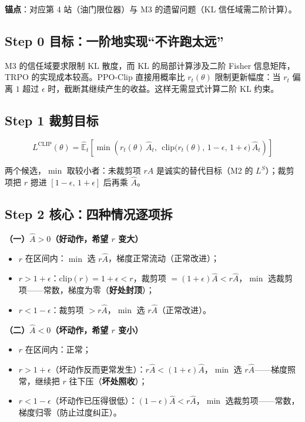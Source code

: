 \documentclass[UTF8,12pt,a4paper]{ctexrep}
\begin{document}
\textbf{锚点}：对应第 4 站（油门限位器）与 M3 的遗留问题（KL 信任域需二阶计算）。

\subsection*{Step 0 \; 目标：一阶地实现``不许跑太远''}

M3 的信任域要求限制 KL 散度，而 KL 的局部计算涉及二阶 Fisher 信息矩阵，TRPO 的实现成本较高。PPO-Clip 直接用概率比 $r_t(\theta)$ 限制更新幅度：当 $r_t$ 偏离 $1$ 超过 $\epsilon$ 时，截断其继续产生的收益。这样无需显式计算二阶 KL 约束。

\subsection*{Step 1 \; 裁剪目标}

$$
L^{\mathrm{CLIP}}(\theta) = \hat{\mathbb{E}}_t\left[\min\left(r_t(\theta)\,\hat{A}_t,\ \ \mathrm{clip}\big(r_t(\theta),\, 1-\epsilon,\, 1+\epsilon\big)\,\hat{A}_t\right)\right]
$$

两个候选，$\min$ 取较小者：未裁剪项 $r\hat{A}$ 是诚实的替代目标（M2 的 $L^{S}$）；裁剪项把 $r$ 摁进 $[1-\epsilon,\,1+\epsilon]$ 后再乘 $\hat{A}$。

\subsection*{Step 2 \; 核心：四种情况逐项拆}

\textbf{（一）$\hat{A} > 0$（好动作，希望 $r$ 变大）}

\begin{itemize}[nosep]
  \item $r$ 在区间内：$\min$ 选 $r\hat{A}$，梯度正常流动（正常改进）；
  \item $r > 1+\epsilon$：$\mathrm{clip}(r) = 1+\epsilon < r$，裁剪项 $=(1+\epsilon)\hat{A} < r\hat{A}$，$\min$ 选裁剪项——常数，梯度为零（\textbf{好处封顶}）；
  \item $r < 1-\epsilon$：裁剪项 $> r\hat{A}$，$\min$ 选 $r\hat{A}$（正常改进）。
\end{itemize}

\textbf{（二）$\hat{A} < 0$（坏动作，希望 $r$ 变小）}

\begin{itemize}[nosep]
  \item $r$ 在区间内：正常；
  \item $r > 1+\epsilon$（坏动作反而更常发生）：$r\hat{A} < (1+\epsilon)\hat{A}$，$\min$ 选 $r\hat{A}$——梯度照常，继续把 $r$ 往下压（\textbf{坏处照收}）；
  \item $r < 1-\epsilon$（坏动作已压得很低）：$(1-\epsilon)\hat{A} < r\hat{A}$，$\min$ 选裁剪项——常数，梯度归零（防止过度纠正）。
\end{itemize}
\end{document}
